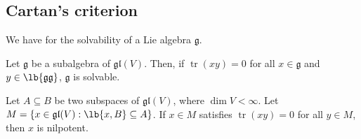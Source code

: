 \documentclass{article}
\DeclarePairedDelimiter\lb\lbrack\rbrack
\DeclareMathOperator{\tr}{tr}
\newcommand*\frkg{{\ensuremath{\mathfrak{g}}}}
\newcommand*\gl{\ensuremath{\mathfrak{gl}}}
\begin{document}
\subsection{Cartan's criterion}

We have  for the solvability of a Lie algebra $\frkg$.

\begin{theorem}
    \label{thm:Cartan'sCriterion}
    Let $\frkg$ be a subalgebra of $\gl(V)$.
    Then, if $\tr(xy) = 0$ for all $x \in \frkg$ and $y \in \lb{\frkg\frkg}$, $\frkg$ is solvable.
\end{theorem}

\begin{lemma}
    \label{lem:TraceNilpotence}
    Let $A \subseteq B$ be two subspaces of $\gl(V)$, where $\dim V < \infty$.
    Let $M = \{x \in \gl(V) : \lb{x,B} \subseteq A\}$.
    If $x \in M$ satisfies $\tr(xy) = 0$ for all $y \in M$, then $x$ is nilpotent.
\end{lemma}
\end{document}
